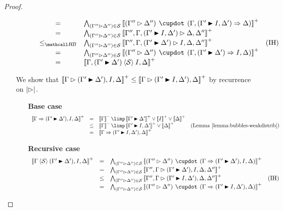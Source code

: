 \begin{proof}
\begin{itemize}
\begin{itemize}
$$\begin{array}{rcll}
        &=& \psintAndMix{(\Gamma'' \J \Delta'')}{\cS}{\Gamma, (\Gamma' \JB I, \Delta')}{\Delta} & \\
        &=& \psintAnd{(\Gamma'' \J \Delta'')}{\cS}{\Gamma'', \Gamma, (\Gamma' \JB I, \Delta') \J \Delta, \Delta''} & \\
        &\sementHB& \psintAnd{(\Gamma'' \J \Delta'')}{\cS}{\Gamma'', \Gamma, (\Gamma' \JB \Delta') \J I, \Delta, \Delta''} &\text{(IH)} \\
        &=& \psintAndMix{(\Gamma'' \J \Delta'')}{\cS}{\Gamma, (\Gamma' \JB \Delta')}{I, \Delta} & \\
        &=& \psint{\Gamma, (\Gamma' \JB \Delta') \piq{\cS} I, \Delta} & \\
      \end{array}
      $$
    \end{itemize}
    \item[{\rnmsf{f{+}{+}{\uparrow}}}]
    We show that $\psint{\Gamma \J (\Gamma' \JB \Delta'), I, \Delta} \sement
    \psint{\Gamma \J (\Gamma' \JB I, \Delta'), \Delta}$ by recurrence on
    $\bradepth{\J}$.
    \begin{itemize}
      \item[\textbf{Base case}]
      $$
      \begin{array}{rcll}
        \psint{\Gamma \seq (\Gamma' \JB \Delta'), I, \Delta}
        &=& \nsint{\Gamma} \limp \psint{\Gamma' \JB \Delta'} \lor \psint{I} \lor \psint{\Delta} & \\
        &\sement& \nsint{\Gamma} \limp \psint{\Gamma' \JB I, \Delta'} \lor \psint{\Delta} &\text{(\reflemma{bubbles-weakdistrib})} \\
        &=& \psint{\Gamma \seq (\Gamma' \JB I, \Delta'), \Delta} & \\
      \end{array}
      $$
      \item[\textbf{Recursive case}]
      $$
      \begin{array}{rcll}
        \psint{\Gamma \piq{\cS} (\Gamma' \JB \Delta'), I, \Delta}
        &=& \psintAndMix{(\Gamma'' \J \Delta'')}{\cS}{\Gamma}{(\Gamma' \JB \Delta'), I, \Delta} & \\
        &=& \psintAnd{(\Gamma'' \J \Delta'')}{\cS}{\Gamma'', \Gamma \J (\Gamma' \JB \Delta'), I, \Delta, \Delta''} & \\
        &\sement& \psintAnd{(\Gamma'' \J \Delta'')}{\cS}{\Gamma'', \Gamma \J (\Gamma' \JB I, \Delta'), \Delta, \Delta''} &\text{(IH)} \\
        &=& \psintAndMix{(\Gamma'' \J \Delta'')}{\cS}{\Gamma}{(\Gamma' \JB I, \Delta'), \Delta} & \\

\end{array}$$
\end{itemize}
\end{itemize}
\end{proof}

